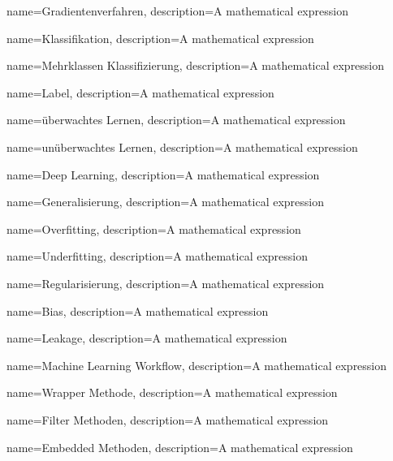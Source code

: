 {
        name=Gradientenverfahren,
        description={A mathematical expression}
}

{
        name=Klassifikation,
        description={A mathematical expression}
}

{
        name=Mehrklassen Klassifizierung,
        description={A mathematical expression}
}

{
        name=Label,
        description={A mathematical expression}
}

{
        name=überwachtes Lernen,
        description={A mathematical expression}
}

{
        name=unüberwachtes Lernen,
        description={A mathematical expression}
}

{
        name=Deep Learning,
        description={A mathematical expression}
}

{
        name=Generalisierung,
        description={A mathematical expression}
}

{
        name=Overfitting,
        description={A mathematical expression}
}

{
        name=Underfitting,
        description={A mathematical expression}
}

{
        name=Regularisierung,
        description={A mathematical expression}
}

{
        name=Bias,
        description={A mathematical expression}
}

{
        name=Leakage,
        description={A mathematical expression}
}

{
        name=Machine Learning Workflow,
        description={A mathematical expression}
}

{
        name=Wrapper Methode,
        description={A mathematical expression}
}

{
        name=Filter Methoden,
        description={A mathematical expression}
}

{
        name=Embedded Methoden,
        description={A mathematical expression}
}

